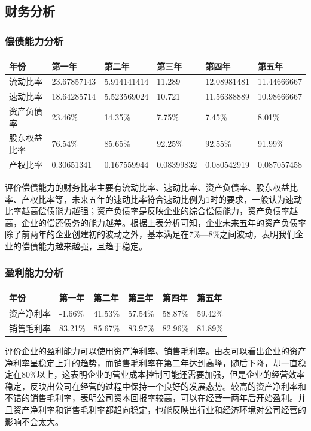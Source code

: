 \documentclass[UTF8]{ctexart}
\begin{document}
\subsection{财务分析}
\subsubsection{偿债能力分析}
\begin{table}[H]
	\centering
	\begin{tabular}{|l|l|l|l|l|l|}
		\hline
		年份         & 第一年      & 第二年      & 第三年     & 第四年      & 第五年      \\ \hline
		流动比率     & 23.67857143 & 5.914141414 & 11.289     & 12.08981481 & 11.44666667 \\ \hline
		速动比率     & 18.64285714 & 5.523569024 & 10.721     & 11.56388889 & 10.98666667 \\ \hline
		资产负债率   & 23.46\%     & 14.35\%     & 7.75\%     & 7.45\%      & 8.01\%      \\ \hline
		股东权益比率 & 76.54\%     & 85.65\%     & 92.25\%    & 92.55\%     & 91.99\%     \\ \hline
		产权比率     & 0.30651341  & 0.167559944 & 0.08399832 & 0.080542919 & 0.087057458 \\ \hline
	\end{tabular}
\end{table}
评价偿债能力的财务比率主要有流动比率、速动比率、资产负债率、股东权益比率、产权比率等，未来五年的速动比率符合速动比例为1时的要求，一般认为速动比率越高偿债能力越强；资产负债率是反映企业的综合偿债能力，资产负债率越高，企业的偿还债务的能力越差。根据上表分析可知，企业未来五年的资产负债率除了前两年的企业创建初的波动之外，基本满足在7\%—8\%之间波动，表明我们企业的偿债能力越来越强，且趋于稳定。
\subsubsection{盈利能力分析}
\begin{table}[H]
	\centering
	\begin{tabular}{|l|l|l|l|l|l|}
		\hline
		年份       & 第一年  & 第二年  & 第三年  & 第四年  & 第五年  \\ \hline
		资产净利率 & -1.66\% & 41.53\% & 57.54\% & 58.87\% & 59.42\% \\ \hline
		销售毛利率 & 83.21\% & 85.67\% & 83.97\% & 82.96\% & 81.89\% \\ \hline
	\end{tabular}
\end{table}
评价企业的盈利能力可以使用资产净利率、销售毛利率。由表可以看出企业的资产净利率呈稳定上升的趋势，而销售毛利率在第二年达到高峰，随后下降，却一直稳定在80\%以上，这表明企业的营业成本控制可能还需要加强，但是企业的经营效率稳定，反映出公司在经营的过程中保持一个良好的发展态势。较高的资产净利率和不错的销售毛利率，表明公司资本回报率较高，可以在经营一两年后开始盈利。并且资产净利率和销售毛利率都趋向稳定，也能反映出行业和经济环境对公司经营的影响不会太大。
\end{document}
